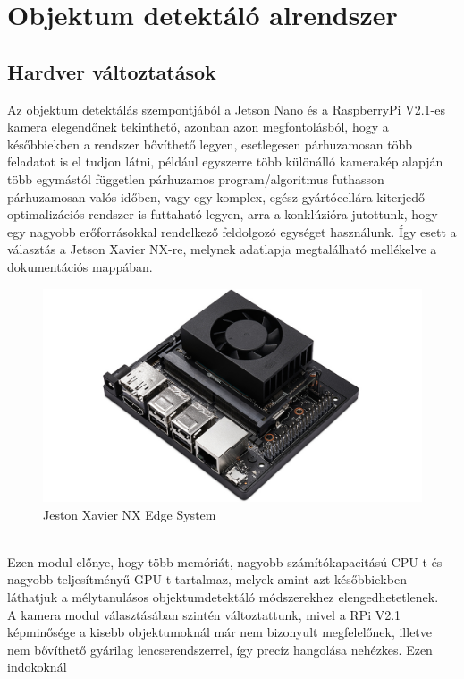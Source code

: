 \documentclass{article}
\begin{document}
\section{Objektum detektáló alrendszer}
\subsection{Hardver változtatások}
Az objektum detektálás szempontjából a Jetson Nano és a RaspberryPi V2.1-es kamera
elegendőnek tekinthető, azonban azon megfontolásból, hogy a későbbiekben 
a rendszer bővíthető legyen, esetlegesen párhuzamosan több feladatot is el
tudjon látni, például egyszerre több különálló kamerakép alapján több 
egymástól független párhuzamos program/algoritmus futhasson párhuzamosan valós
időben, vagy egy komplex, egész gyártócellára kiterjedő optimalizációs rendszer
is futtaható legyen, arra a konklúzióra jutottunk, hogy egy nagyobb erőforrásokkal
rendelkező feldolgozó egységet használunk. Így esett a választás a Jetson Xavier NX-re,
melynek adatlapja megtalálható mellékelve a dokumentációs mappában.\\[5pt]
\begin{figure}[h]
    \centering
    \includegraphics[scale=0.3]{xavier.jpg}
    \caption[]{Jeston Xavier NX Edge System}
\end{figure}\\
Ezen modul előnye, hogy több memóriát, nagyobb számítókapacitású CPU-t és 
nagyobb teljesítményű GPU-t tartalmaz, melyek amint azt későbbiekben láthatjuk 
a mélytanulásos objektumdetektáló módszerekhez elengedhetetlenek.\\[15pt]
A kamera modul választásában szintén változtattunk, mivel a RPi V2.1 képminősége
a kisebb objektumoknál már nem bizonyult megfelelőnek, illetve nem bővíthető
gyárilag lencserendszerrel, így precíz hangolása nehézkes. Ezen indokoknál
\end{document}
